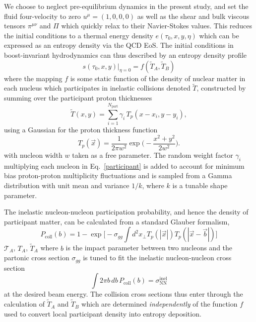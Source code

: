 \documentclass[aps,prc,reprint,amsmath,nofootinbib]{revtex4-1}
\newcommand{\T}{\tilde{T}}
\begin{document}
We choose to neglect pre-equilibrium dynamics in the present study, and set the fluid four-velocity to zero ${u^\mu = (1,0,0,0)}$ as well as the shear and bulk viscous tensors $\pi^{\mu\nu}$ and $\Pi$ which quickly relax to their Navier-Stokes values. This reduces the initial conditions to a thermal energy density $e(\tau_0, x, y, \eta)$ which can be expressed as an entropy density via the QCD EoS. The initial conditions in boost-invariant hydrodynamics can thus described by an entropy density profile
\begin{equation}
    \label{mapping}
    s(\tau_0, x, y)\vert_{\eta=0} = f(\T_A, \T_B)
\end{equation}
where the mapping $f$ is some static function of the density of nuclear matter in each nucleus which participates in inelastic collisions denoted $\T$, constructed by summing over the participant proton thicknesses
\begin{equation}
    \label{participant}
    \T(x, y) = \sum\limits_{i=1}^{N_\text{part}} \gamma_i\, T_p(x - x_i, y - y_i),
\end{equation}
using a Gaussian for the proton thickness function
\begin{equation}
    T_p(\vec{x}) = \frac{1}{2\pi w^2} \exp\bigg(\!-\frac{x^2 + y^2}{2 w^2}\bigg). 
\end{equation}    
with nucleon width $w$ taken as a free parameter. The random weight factor $\gamma_i$ multiplying each nucleon in Eq.~\eqref{participant} is added to account for minimum bias proton-proton multiplicity fluctuations and is sampled from a Gamma distribution with unit mean and variance $1/k$, where $k$ is a tunable shape parameter.

The inelastic nucleon-nucleon participation probability, and hence the density of participant matter, can be calculated from a standard Glauber formalism,
\begin{equation}
    P_\text{coll}(b) = 1 - \exp \bigg[ -\sigma_{gg} \int d^2x_\perp T_p(|\vec{x}|) T_p(|\vec{x} - \vec{b}|) \bigg ] 
\end{equation}
$\mathcal{T}_A$, $T_A$, $\T_A$
where $b$ is the impact parameter between two nucleons and the partonic cross section $\sigma_{gg}$ is tuned to fit the inelastic nucleon-nucleon cross section
\begin{equation}
    \int 2 \pi b\, db\, P_\text{coll}(b) = \sigma_\text{NN}^\text{inel} 
\end{equation}
at the desired beam energy. The collision cross sections thus enter through the calculation of $\T_A$ and $\T_B$ which are determined \emph{independently} of the function $f$ used to convert local participant density into entropy deposition.
\end{document}
